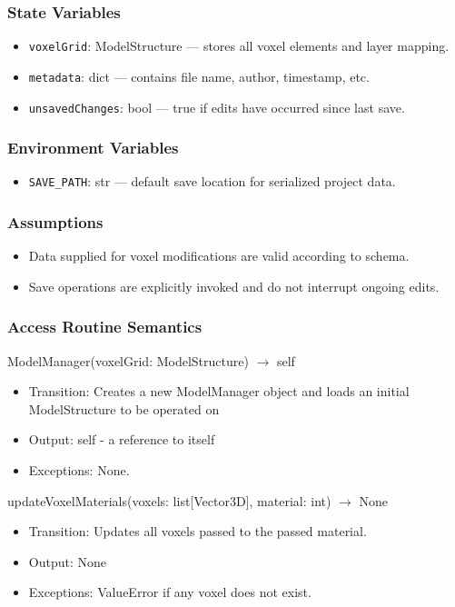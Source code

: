 \documentclass[12pt, titlepage]{article}
\begin{document}
\subsubsection{State Variables}
\begin{itemize}
  \item \texttt{voxelGrid}: ModelStructure — stores all voxel elements and layer mapping.
  \item \texttt{metadata}: dict — contains file name, author, timestamp, etc.
  \item \texttt{unsavedChanges}: bool — true if edits have occurred since last save.
\end{itemize}

\subsubsection{Environment Variables}
\begin{itemize}
  \item \texttt{SAVE\_PATH}: str — default save location for serialized project data.
\end{itemize}

\subsubsection{Assumptions}
\begin{itemize}
  \item Data supplied for voxel modifications are valid according to schema.
  \item Save operations are explicitly invoked and do not interrupt ongoing edits.
\end{itemize}

\subsubsection{Access Routine Semantics}

ModelManager(voxelGrid: ModelStructure) $\rightarrow$ self
\begin{itemize}
  \item Transition: Creates a new ModelManager object and loads an initial ModelStructure to be operated on
  \item Output: self - a reference to itself
  \item Exceptions: None.
\end{itemize}

updateVoxelMaterials(voxels: list[Vector3D], material: int) $\rightarrow$ None
\begin{itemize}
  \item Transition: Updates all voxels passed to the passed material.
  \item Output: None
  \item Exceptions: ValueError if any voxel does not exist.
\end{itemize}
\end{document}
